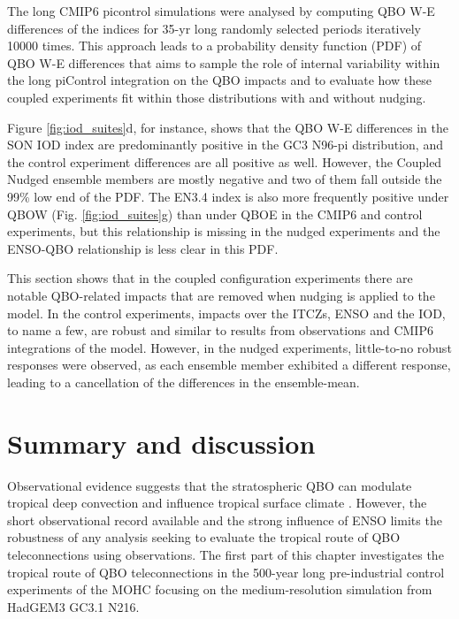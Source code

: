 The long CMIP6 picontrol simulations were analysed by computing QBO W-E differences of the indices for 35-yr long randomly selected periods iteratively 10000 times.  
This approach leads to a probability density function (PDF) of QBO W-E differences that aims to sample the role of internal variability within the long piControl integration on the QBO impacts and to evaluate how these coupled experiments fit within those distributions with and without nudging. 

Figure \ref{fig:iod_suites}d, for instance, shows that the QBO W-E differences in the SON IOD index are predominantly positive in the GC3 N96-pi distribution, and the control experiment differences are all positive as well. However, the Coupled Nudged ensemble members are mostly negative and two of them fall outside the 99\% low end of the PDF.
The EN3.4 index is also more frequently positive under QBOW (Fig. \ref{fig:iod_suites}g) than under QBOE in the CMIP6 and control experiments, but this relationship is missing in the nudged experiments and the ENSO-QBO relationship is less clear in this PDF.

This section shows that in the coupled configuration experiments there are notable QBO-related impacts that are removed when nudging is applied to the model. In the control experiments, impacts over the ITCZs, ENSO and the IOD, to name a few, are robust and similar to results from observations and CMIP6 integrations of the model. However, in the nudged experiments, little-to-no robust responses were observed, as each ensemble member exhibited a different response, leading to a cancellation of the differences in the ensemble-mean.

\section{Summary and discussion}

Observational evidence suggests that the stratospheric QBO can modulate tropical deep  convection and influence tropical surface climate \citep{collimore2003,liess2012,gray2018}. However, the short observational record available and the strong influence of ENSO limits the robustness of any analysis seeking to evaluate the tropical route of QBO teleconnections using observations.
The first part of this chapter investigates the tropical route of QBO teleconnections in the 500-year long pre-industrial control experiments of the MOHC focusing on the medium-resolution simulation from HadGEM3 GC3.1 N216. 

